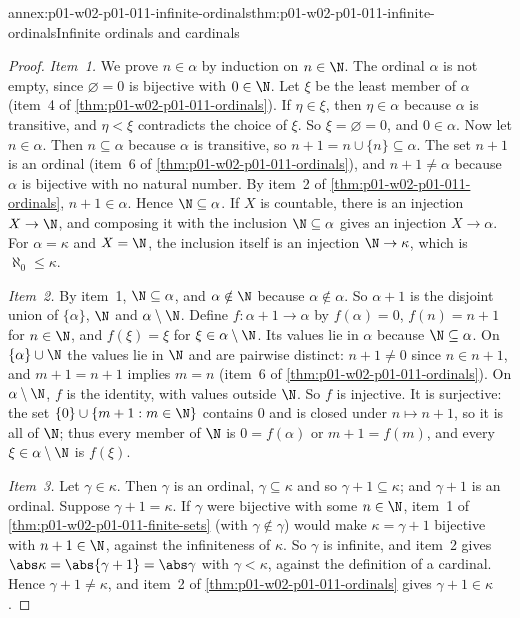 \begin{annexitem}{annex:p01-w02-p01-011-infinite-ordinals}{thm:p01-w02-p01-011-infinite-ordinals}{Infinite ordinals and cardinals}
\begin{proof}
\emph{Item~1.} We prove \(n\in\alpha\) by induction on \(n\in\N\). The ordinal
\(\alpha\) is not empty, since \(\varnothing=0\) is bijective with
\(0\in\N\). Let \(\xi\) be the least member of \(\alpha\)
(item~4 of \cref{thm:p01-w02-p01-011-ordinals}). If \(\eta\in\xi\), then
\(\eta\in\alpha\) because \(\alpha\) is transitive, and \(\eta<\xi\)
contradicts the choice of \(\xi\). So \(\xi=\varnothing=0\), and
\(0\in\alpha\). Now let \(n\in\alpha\). Then \(n\subseteq\alpha\) because
\(\alpha\) is transitive, so \(n+1=n\cup\{n\}\subseteq\alpha\). The set
\(n+1\) is an ordinal (item~6 of \cref{thm:p01-w02-p01-011-ordinals}), and
\(n+1\ne\alpha\) because \(\alpha\) is bijective with no natural number. By
item~2 of \cref{thm:p01-w02-p01-011-ordinals}, \(n+1\in\alpha\). Hence
\(\N\subseteq\alpha\). If \(X\) is countable, there is an injection
\(X\to\N\), and composing it with the inclusion \(\N\subseteq\alpha\) gives
an injection \(X\to\alpha\). For \(\alpha=\kappa\) and \(X=\N\), the inclusion
itself is an injection \(\N\to\kappa\), which is \(\aleph_0\leq\kappa\).

\emph{Item~2.} By item~1, \(\N\subseteq\alpha\), and \(\alpha\notin\N\)
because \(\alpha\notin\alpha\). So \(\alpha+1\) is the disjoint union of
\(\{\alpha\}\), \(\N\) and \(\alpha\setminus\N\). Define
\(f:\alpha+1\to\alpha\) by \(f(\alpha)=0\), \(f(n)=n+1\) for \(n\in\N\),
and \(f(\xi)=\xi\) for \(\xi\in\alpha\setminus\N\). Its values lie in
\(\alpha\) because \(\N\subseteq\alpha\). On \(\{\alpha\}\cup\N\) the values
lie in \(\N\) and are pairwise distinct: \(n+1\ne0\) since \(n\in n+1\), and
\(m+1=n+1\) implies \(m=n\) (item~6 of
\cref{thm:p01-w02-p01-011-ordinals}). On \(\alpha\setminus\N\), \(f\) is the
identity, with values outside \(\N\). So \(f\) is injective. It is
surjective: the set \(\{0\}\cup\{m+1:m\in\N\}\) contains \(0\) and is closed
under \(n\mapsto n+1\), so it is all of \(\N\); thus every member of \(\N\)
is \(0=f(\alpha)\) or \(m+1=f(m)\), and every
\(\xi\in\alpha\setminus\N\) is \(f(\xi)\).

\emph{Item~3.} Let \(\gamma\in\kappa\). Then \(\gamma\) is an ordinal,
\(\gamma\subseteq\kappa\) and so \(\gamma+1\subseteq\kappa\); and
\(\gamma+1\) is an ordinal. Suppose \(\gamma+1=\kappa\). If \(\gamma\) were
bijective with some \(n\in\N\), item~1 of
\cref{thm:p01-w02-p01-011-finite-sets} (with \(\gamma\notin\gamma\)) would
make \(\kappa=\gamma+1\) bijective with \(n+1\in\N\), against the
infiniteness of \(\kappa\). So \(\gamma\) is infinite, and item~2 gives
\(\abs\kappa=\abs{\gamma+1}=\abs\gamma\) with \(\gamma<\kappa\), against the
definition of a cardinal. Hence \(\gamma+1\ne\kappa\), and item~2 of
\cref{thm:p01-w02-p01-011-ordinals} gives \(\gamma+1\in\kappa\).


\end{proof}
\end{annexitem}
